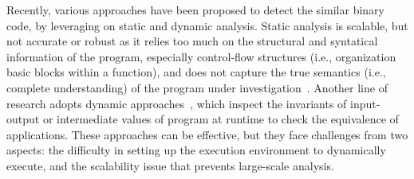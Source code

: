 Recently, various approaches have been proposed to detect the similar binary code, by leveraging on static and dynamic analysis.
Static analysis is scalable, but not accurate or robust as it relies too much on the structural and syntatical information of the program, especially control-flow structures (i.e., organization basic blocks within a function), and does not capture the true semantics (i.e., complete understanding) of the program under investigation~\cite{DBLP:conf/pldi/DavidY14,saebjornsen2009detecting,luo2014semantics,DBLP:conf/sp/PewnyGGRH15}.
Another line of research adopts dynamic approaches~\cite{DBLP:conf/issta/JiangS09,DBLP:conf/asplos/Schkufza0A13,DBLP:conf/icse/JhiWJZLW11,DBLP:conf/uss/EgeleWCB14}, which inspect the invariants of input-output or intermediate values of program at runtime to check the equivalence of applications. These approaches can be effective, but they face challenges from two aspects: the difficulty in setting up the execution environment to dynamically execute, and the scalability issue that prevents large-scale analysis.

